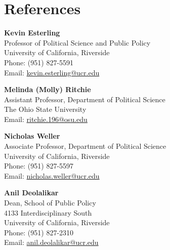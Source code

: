 \documentclass[letterpaper,11pt]{article}
\newcommand{\ucr}{University of California, Riverside}
\begin{document}
\vspace{.25cm}


\section{References}

\textbf{Kevin Esterling} \\
Professor of Political Science and Public Policy \\
\ucr \\
Phone: (951) 827-5591 \\
Email: \href{mailto:kevin.esterling@ucr.edu}{kevin.esterling@ucr.edu}

\bigskip

\textbf{Melinda (Molly) Ritchie} \\
Assistant Professor, Department of Political Science \\
The Ohio State University \\
Email: \href{mailto:ritchie.196@osu.edu}{ritchie.196@osu.edu}

\bigskip

\textbf{Nicholas Weller} \\
Associate Professor, Department of Political Science \\
\ucr \\
Phone: (951) 827-5597 \\
Email: \href{mailto:nicholas.weller@ucr.edu}{nicholas.weller@ucr.edu}  

\bigskip

\textbf{Anil Deolalikar} \\
Dean, School of Public Policy \\
4133 Interdisciplinary South \\
\ucr \\
Phone: (951) 827-2310 \\
Email: \href{mailto:anil.deolalikar@ucr.edu}{anil.deolalikar@ucr.edu}
\end{document}
